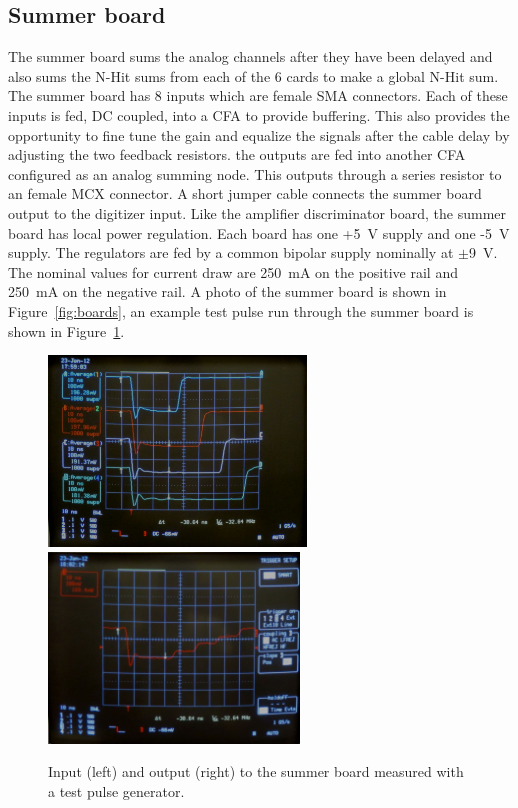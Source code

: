 \documentclass{JINST}
\begin{document}
\subsection{Summer board}
\label{sec:Sum}
%
The summer board sums the analog channels after they have been
delayed and also sums the N-Hit sums from each of the 6 cards to make
a global N-Hit sum. The summer board has 8 inputs which are female
SMA connectors. Each of these inputs is fed, DC coupled, into a CFA
to provide buffering. This also provides the opportunity to fine tune
the gain and equalize the signals after the cable delay by adjusting
the two feedback resistors. the outputs are fed into another CFA
configured as an analog summing node. This outputs through a series
resistor to an female MCX connector. A short jumper cable connects
the summer board output to the digitizer input. Like the amplifier
discriminator board, the summer board has local power regulation.
Each board has one +5~V supply and one -5~V supply. The regulators are
fed by a common bipolar supply nominally at $\pm$9~V.
The nominal values for current draw are 250~mA on the positive
rail and 250~mA on the negative rail. A photo of the summer
board is shown in Figure~\ref{fig:boards}, an example test pulse run
through the summer board is shown in Figure~\ref{fig:summerpulse}.

\begin{figure}[ht]
	\begin{center}
		\includegraphics[height=2in, keepaspectratio=true]{graphics/sumpulseinput.jpg}
		\includegraphics[height=2in, keepaspectratio=true]{graphics/sumpulseoutput.jpg}
		\caption{Input (left) and output (right) to the summer board measured with a test pulse generator.
		\label{fig:summerpulse}}
	\end{center}
\end{figure}
\end{document}

